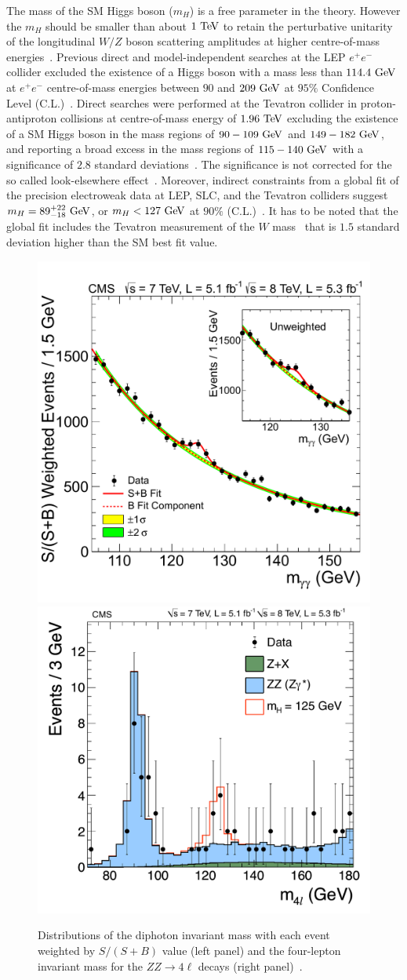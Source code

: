 The mass of the SM Higgs boson ($m_{H}$) is a free parameter in the theory. However the $m_{H}$ should be smaller than about $1~\mathrm{Te\kern -0.1em V}$ to retain the perturbative unitarity of the longitudinal $W/Z$ boson scattering amplitudes at higher centre-of-mass energies~\cite{Cornwall:1973tb,Cornwall:1974km,LlewellynSmith:1973yud,Lee:1977eg}.  Previous direct and model-independent searches at the LEP $e^{+}e^{-}$ collider excluded the existence of a Higgs boson with a mass less than $114.4~\mathrm{Ge\kern -0.1em V}$ at $e^+e^-$ centre-of-mass energies between $90$ and $209~\mathrm{Ge\kern -0.1em V}$ at $95\%$ Confidence Level (C.L.)~\cite{Barate:2003sz}. Direct searches were performed at the Tevatron collider in proton-antiproton collisions at centre-of-mass energy of $1.96~\mathrm{Te\kern -0.1em V}$ excluding the existence of a SM Higgs boson in the mass regions of $90-109~\mathrm{Ge\kern -0.1em V}$ and $149-182~\mathrm{Ge\kern -0.1em V}$, and reporting a broad excess in the mass regions of $115-140~\mathrm{Ge\kern -0.1em V}$ with a significance of $2.8$ standard deviations~\cite{Aaltonen:2013ioz}. The significance is not corrected for the so called look-elsewhere effect~\cite{loook}. Moreover, indirect constraints from a global fit of the precision electroweak data at LEP, SLC, and the Tevatron colliders suggest $m_{H}=89^{+22}_{-18}~\mathrm{Ge\kern -0.1em V}$, or $m_{H}<127~\mathrm{Ge\kern -0.1em V}$ at $90\%$ (C.L.)~\cite{Agashe:2014kda}. It has to be noted that the global fit includes the Tevatron measurement of the $W$ mass~\cite{Aaltonen:2013iut} that is $1.5$ standard deviation higher than the SM best fit value. 

\begin{figure}[h]
\centering
\includegraphics[width=0.49\columnwidth]{figures_chapter2/gammagamma}
\includegraphics[width=0.49\columnwidth]{figures_chapter2/zz4l}
\caption{Distributions of the diphoton invariant mass with each event weighted by $S/(S+B)$ value (left panel) and the four-lepton invariant mass for the $ZZ \rightarrow 4 \ell$ decays (right panel)~\cite{Chatrchyan:2012xdj}.}
\label{fig:cms_higgs}
\end{figure}

